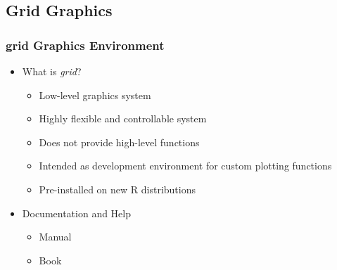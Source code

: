 \documentclass{beamer}
\newcommand{\Rpackage}[1]{{\textit{#1}}}
\begin{document}
\subsection{Grid Graphics}
\begin{frame}[containsverbatim]  
	\frametitle{grid Graphics Environment}
\begin{itemize}
	\item What is \Rpackage{grid}?
        \begin{itemize}
		\item Low-level graphics system 
		\item Highly flexible and controllable system
		\item Does not provide high-level functions 
		\item Intended as development environment for custom plotting functions 
		\item Pre-installed on new R distributions
        \end{itemize}
        \item Documentation and Help
        \begin{itemize}
                \item Manual \href{http://www.stat.auckland.ac.nz/~paul/grid/grid.html}{{}}
                \item Book \href{http://www.stat.auckland.ac.nz/~paul/RGraphics/rgraphics.html}{{}}
        \end{itemize}
\end{itemize}
\end{frame}
\end{document}
